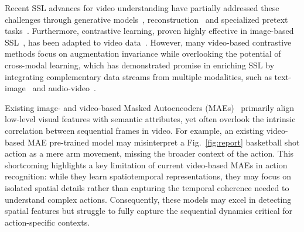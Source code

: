 Recent SSL advances for video understanding have partially addressed these challenges through generative models~\cite{chen2020generative, esser2021taming}, reconstruction~\cite{vondrick2016generating,yao2020video} and specialized pretext tasks~\cite{jing2018self, yao2020video, wang2021unsupervised}. Furthermore, contrastive learning, proven highly effective in image-based SSL~\cite{kalantidis2020hard, grill2020bootstrap, he2020momentum, misra2020self}, has been adapted to video data~\cite{huang2021self, qian2021spatiotemporal, pan2021videomoco}. However, many video-based contrastive methods focus on augmentation invariance while overlooking the potential of cross-modal learning, which has demonstrated promise in enriching SSL by integrating complementary data streams from multiple modalities, such as text-image~\cite{desai2021virtex, radford2021learning, sariyildiz2020learning} and audio-video~\cite{morgado2021robust, korbar2018cooperative}.

Existing image- and video-based Masked Autoencoders (MAEs)~\cite{wang2022bevt,girdhar2023omnimae} primarily align low-level visual features with semantic attributes, yet often overlook the intrinsic correlation between sequential frames in video. For example, an existing video-based MAE pre-trained model may misinterpret a Fig.~\ref{fig:report} basketball shot action as a mere arm movement, missing the broader context of the action. This shortcoming highlights a key limitation of current video-based MAEs in action recognition: while they learn spatiotemporal representations, they may focus on isolated spatial details rather than capturing the temporal coherence needed to understand complex actions. Consequently, these models may excel in detecting spatial features but struggle to fully capture the sequential dynamics critical for action-specific contexts.


